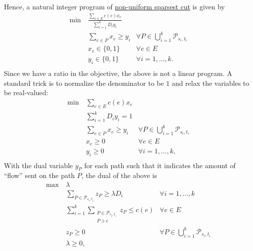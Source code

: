 Hence, a natural integer program of \hyperref[prb:non-uniform-sparsest-cut]{non-uniform sparsest cut} is given by
\[
	\begin{aligned}
		\min~ & \frac{\sum_{e \in E} c(e) x_e}{\sum_{i=1}^{k} D_i y_i}                                                           \\
		      & \sum_{e \in P} x_e \geq y_i                            & \forall P \in \bigcup_{i=1}^{k} \mathcal{P} _{s_i, t_i} \\
		      & x_e \in \{ 0, 1 \}                                     & \forall e \in E                                         \\
		      & y_i \in \{ 0, 1 \}                                     & \forall i = 1, \dots , k.                               \\
	\end{aligned}
\]
Since we have a ratio in the objective, the above is not a linear program. A standard trick is to normalize the denominator to be \(1\) and relax the variables to be real-valued:
\begin{equation}\label{eq:non-uniform-sparsest-cut-LP-primal}
	\begin{aligned}
		\min~ & \sum_{e \in E} c(e) x_e                                                               \\
		      & \sum_{i=1}^{k} D_i y_i = 1                                                            \\
		      & \sum_{e \in P} x_e \geq y_i & \forall P \in \bigcup_{i=1}^{k} \mathcal{P} _{s_i, t_i} \\
		      & x_e \geq 0                  & \forall e \in E                                         \\
		      & y_i \geq 0                  & \forall i = 1, \dots , k,                               \\
	\end{aligned}
\end{equation}
With the dual variable \(y_P\) for each path such that it indicates the amount of ``flow'' sent on the path \(P\), the dual of the above is
\begin{equation}\label{eq:non-uniform-sparsest-cut-LP-dual}
	\begin{aligned}
		\max~ & \lambda                                                                                                                \\
		      & \sum_{P \in \mathcal{P} _{s_i, t_i}} z_P \geq \lambda D_i    & \forall i = 1, \dots , k                                \\
		      & \sum_{i=1}^{k} \sum_{\substack{P \in \mathcal{P} _{s_i, t_i}                                                           \\ P \ni e}} z_P \leq c(e) & \forall e \in E                                         \\
		      & z_P \geq 0                                                   & \forall P \in \bigcup_{i=1}^{k} \mathcal{P} _{s_i, t_i} \\
		      & \lambda \geq 0,
	\end{aligned}
\end{equation}
